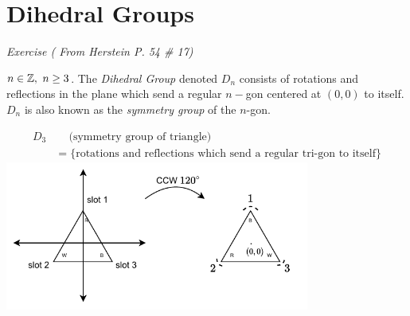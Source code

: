 \section{Dihedral Groups}
\textit{Exercise ( From Herstein P. 54 \# 17)}\\
\begin{definition}
$n\in {\mathbb{ Z}}, \ n \geq 3$. The \textit{Dihedral Group} denoted $D_n$ consists of rotations and reflections in the plane which send a regular $n-$gon centered at $(0,0)$ to itself. $D_n$ is also known as the \textit{symmetry group} of the $n$-gon.
\end{definition}
\begin{example}
\begin{align}
    D_3 & \ \ \ \ \text{ (symmetry group of triangle)}\nonumber \\
    &= \{ \text{rotations and reflections which send a regular tri-gon to itself} \} \nonumber
\end{align}
\includegraphics[width=0.75\textwidth]{Figures/Dihedral Group Example_1.pdf}


\end{example}
